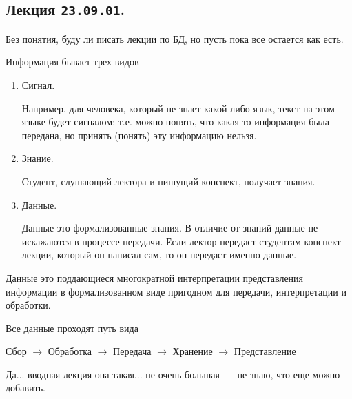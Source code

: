 \subsection{%
  Лекция \texttt{23.09.01}.%
}

\todo Без понятия, буду ли писать лекции по БД, но пусть пока все остается как
есть.

Информация бывает трех видов

\begin{enumerate}
\item
  Сигнал.

  Например, для человека, который не знает какой-либо язык, текст на этом языке
  будет сигналом: т.е. можно понять, что какая-то информация была передана, но
  принять (понять) эту информацию нельзя.

\item
  Знание.

  Студент, слушающий лектора и пишущий конспект, получает знания.

\item
  Данные.

  Данные это формализованные знания. В отличие от знаний данные не искажаются в
  процессе передачи. Если лектор передаст студентам конспект лекции, который он
  написал сам, то он передаст именно данные.
\end{enumerate}

\begin{definition}
  Данные это поддающиеся многократной интерпретации представления информации в
  формализованном виде пригодном для передачи, интерпретации и обработки.
\end{definition}

Все данные проходят путь вида

\begin{center}
  Сбор \(\to\)
  Обработка \(\to\)
  Передача \(\to\)
  Хранение \(\to\)
  Представление
\end{center}

\todo Да... вводная лекция она такая... не очень большая~--- не знаю, что еще
можно добавить.
